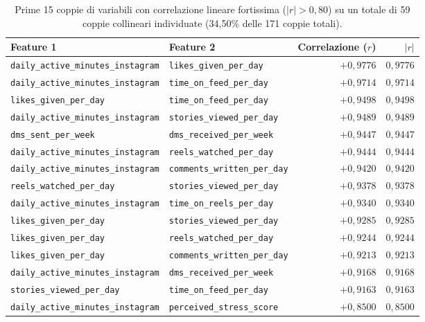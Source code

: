 \begin{table}[H]
\centering
\caption{Prime 15 coppie di variabili con correlazione lineare fortissima ($|r| > 0,80$) su un totale di 59 coppie collineari individuate (34,50\% delle 171 coppie totali).}
\label{tab:strong_corr}
\begin{tabular}{llrr}
\toprule
\textbf{Feature 1} & \textbf{Feature 2} & \textbf{Correlazione ($r$)} & \textbf{$|r|$} \\
\midrule
\texttt{daily\_active\_minutes\_instagram} & \texttt{likes\_given\_per\_day} & $+0,9776$ & $0,9776$ \\
\texttt{daily\_active\_minutes\_instagram} & \texttt{time\_on\_feed\_per\_day} & $+0,9714$ & $0,9714$ \\
\texttt{likes\_given\_per\_day} & \texttt{time\_on\_feed\_per\_day} & $+0,9498$ & $0,9498$ \\
\texttt{daily\_active\_minutes\_instagram} & \texttt{stories\_viewed\_per\_day} & $+0,9489$ & $0,9489$ \\
\texttt{dms\_sent\_per\_week} & \texttt{dms\_received\_per\_week} & $+0,9447$ & $0,9447$ \\
\texttt{daily\_active\_minutes\_instagram} & \texttt{reels\_watched\_per\_day} & $+0,9444$ & $0,9444$ \\
\texttt{daily\_active\_minutes\_instagram} & \texttt{comments\_written\_per\_day} & $+0,9420$ & $0,9420$ \\
\texttt{reels\_watched\_per\_day} & \texttt{stories\_viewed\_per\_day} & $+0,9378$ & $0,9378$ \\
\texttt{daily\_active\_minutes\_instagram} & \texttt{time\_on\_reels\_per\_day} & $+0,9340$ & $0,9340$ \\
\texttt{likes\_given\_per\_day} & \texttt{stories\_viewed\_per\_day} & $+0,9285$ & $0,9285$ \\
\texttt{likes\_given\_per\_day} & \texttt{reels\_watched\_per\_day} & $+0,9244$ & $0,9244$ \\
\texttt{likes\_given\_per\_day} & \texttt{comments\_written\_per\_day} & $+0,9213$ & $0,9213$ \\
\texttt{daily\_active\_minutes\_instagram} & \texttt{dms\_received\_per\_week} & $+0,9168$ & $0,9168$ \\
\texttt{stories\_viewed\_per\_day} & \texttt{time\_on\_feed\_per\_day} & $+0,9163$ & $0,9163$ \\
\texttt{daily\_active\_minutes\_instagram} & \texttt{perceived\_stress\_score} & $+0,8500$ & $0,8500$ \\
\bottomrule
\end{tabular}
\end{table}

